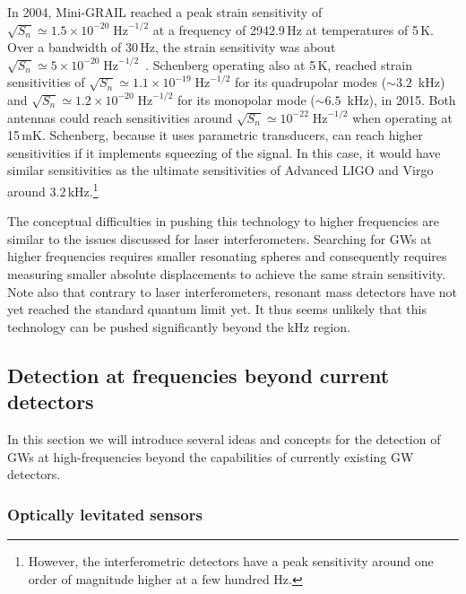 \documentclass[11pt,a4paper]{article}
\begin{document}
In 2004, Mini-GRAIL reached a peak strain sensitivity of $\sqrt{S_n} \simeq 1.5 \times 10^{-20} \;\text{Hz}^{-1/2}$ at a frequency of 2942.9\,Hz at temperatures of 5\,K. Over a bandwidth of 30\,Hz, the strain sensitivity was  about $\sqrt{S_n} \simeq 5 \times 10^{-20}\; \text{Hz}^{-1/2}$~\cite{Gottardi:2007zn}.
Schenberg operating also at 5\,K, reached strain sensitivities of $\sqrt{S_n} \simeq 1.1 \times  10^{-19}\; \text{Hz}^{-1/2}$ for its quadrupolar modes ($\sim 3.2 \,$ kHz) and $\sqrt{S_n} \simeq 1.2 \times  10^{-20}\; \text{Hz}^{-1/2}$ for its monopolar mode ($\sim 6.5 \,$ kHz), in 2015. Both antennas could reach sensitivities around $\sqrt{S_n} \simeq 10^{-22}\; \text{Hz}^{-1/2}$ when operating at 15\,mK. Schenberg, because it uses parametric transducers, can reach higher sensitivities if it implements squeezing of the signal. In this case, it would have similar sensitivities as the ultimate sensitivities of Advanced LIGO and Virgo around 3.2\,kHz.\footnote{However, the interferometric detectors have a peak sensitivity around one order of magnitude higher at a few hundred Hz.}

The conceptual difficulties in pushing this technology to higher frequencies are similar to the issues discussed for laser interferometers. Searching for GWs at higher frequencies requires smaller resonating spheres and consequently requires measuring smaller absolute displacements to achieve the same strain sensitivity. Note also that contrary to laser interferometers, resonant mass detectors have not yet reached the standard quantum limit yet. It thus seems unlikely that this technology can be pushed significantly beyond the kHz region.


\subsection{Detection at frequencies beyond current detectors}

In this section we will introduce several ideas and concepts for the detection of GWs at high-frequencies beyond the capabilities of currently existing GW detectors.

\subsubsection{Optically levitated sensors}
\label{sec:OpticallyLevitatedSensors}
\end{document}
